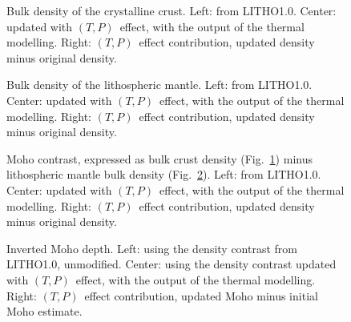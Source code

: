 \begin{subappendices}
\begin{figure}
	\begin{adjustbox}{center}
	\end{adjustbox}
	\caption[Bulk density of the crystalline crust, effect of temperature dependence.]{Bulk density of the crystalline crust.
	Left: from LITHO1.0.
	Center: updated with $(T,P)$~effect, with the output of the thermal modelling. 
	Right: $(T,P)$~effect contribution, updated density minus original density.}
	\label{fig:RhoTP_RhoC}
\end{figure}

\begin{figure}
	\begin{adjustbox}{center}
	\end{adjustbox}
	\caption[Bulk density of the lithospheric mantle, effect of temperature dependence.]{Bulk density of the lithospheric mantle.
	Left: from LITHO1.0.
	Center: updated with $(T,P)$~effect, with the output of the thermal modelling.
	Right: $(T,P)$~effect contribution, updated density minus original density.}
	\label{fig:RhoTP_RhoM}
\end{figure}

\begin{figure}
	\begin{adjustbox}{center}
	\end{adjustbox}
	\caption[Moho contrast, effect of temperature dependence.]{Moho contrast, expressed as bulk crust density (Fig.~\ref{fig:RhoTP_RhoC}) minus lithospheric mantle bulk density (Fig.~\ref{fig:RhoTP_RhoM}).
	Left: from LITHO1.0.
	Center: updated with $(T,P)$~effect, with the output of the thermal modelling. Right: $(T,P)$~effect contribution, updated density minus original density.}
	\label{fig:RhoTP_MohoContrast}
\end{figure}

\begin{figure}
	\begin{adjustbox}{center}
	\end{adjustbox}
	\caption[Inverted Moho depth, effect of temperature dependence.]{Inverted Moho depth.
	Left: using the density contrast from LITHO1.0, unmodified.
	Center: using the density contrast updated with $(T,P)$~effect, with the output of the thermal modelling.
	Right: $(T,P)$~effect contribution, updated Moho minus initial Moho estimate.}
	\label{fig:RhoTP_MohoDepth}
\end{figure}


\end{subappendices}
